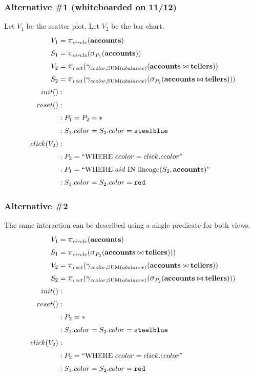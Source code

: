 \documentclass[fleqn,reprint]{sigplanconf}
\begin{document}
\subsubsection{Alternative \#1 (whiteboarded on 11/12)}
Let $V_1$ be the scatter plot.
Let $V_2$ be the bar chart.
\begin{align*}
	V_1&= \mathlarger{\pi}_{circle}(\bf{accounts})\\
	S_1&= \mathlarger{\pi}_{circle}(\mathlarger{\sigma}_{P_1}(\bf{accounts}))\\
	V_2&= \mathlarger{\pi}_{rect}(\mathlarger{\gamma}_{ccolor, \text{SUM}(abalance)}(\bf{accounts}\bowtie{}\bf{tellers}))\\
	S_2&= \mathlarger{\pi}_{rect}(\mathlarger{\gamma}_{ccolor, \text{SUM}(abalance)}(\mathlarger{\sigma}_{P_2}(\bf{accounts}\bowtie{}\bf{tellers})))\\
	init()&:\\
	reset()&:\\
	&: P_1 = P_2 = *\\
	&: S_1.color = S_2.color = \texttt{steelblue}\\
	click(V_2)&:\\
	&: P_2 = ``\text{WHERE}~ccolor=click.ccolor"\\
	&: P_1 = ``\text{WHERE}~aid~\text{IN~lineage}(S_2, \bf{accounts})"\\
	&: S_1.color = S_2.color = \texttt{red}\\
\end{align*}
\subsubsection{Alternative \#2}
The same interaction can be described using a single predicate for both views.
\begin{align*}
	V_1&= \mathlarger{\pi}_{circle}(\bf{accounts})\\
	S_1&= \mathlarger{\pi}_{circle}(\mathlarger{\sigma}_{P_2}(\bf{accounts}\bowtie{}\bf{tellers})))\\
	V_2&= \mathlarger{\pi}_{rect}(\mathlarger{\gamma}_{ccolor, \text{SUM}(abalance)}(\bf{accounts}\bowtie{}\bf{tellers}))\\
	S_2&= \mathlarger{\pi}_{rect}(\mathlarger{\gamma}_{ccolor, \text{SUM}(abalance)}(\mathlarger{\sigma}_{P_2}(\bf{accounts}\bowtie{}\bf{tellers})))\\
	init()&:\\
	reset()&:\\
	&: P_2 = *\\
	&: S_1.color = S_2.color = \texttt{steelblue}\\
	click(V_2)&:\\
	&: P_2 = ``\text{WHERE}~ccolor=click.ccolor"\\
	&: S_1.color = S_2.color = \texttt{red}\\
\end{align*}
\end{document}
